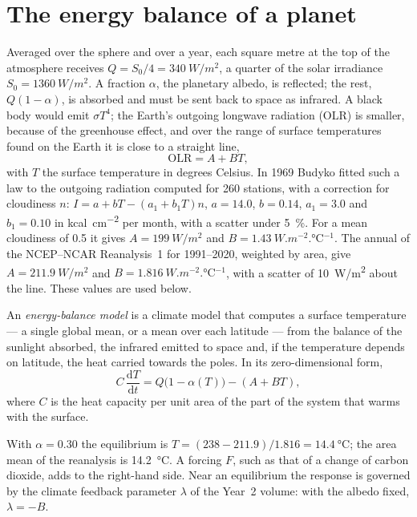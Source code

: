 \section{The energy balance of a planet}\label{sec:b3:climate-models:zero-d}

Averaged over the sphere and over a year, each square metre at the top of
the atmosphere receives $Q = S_0/4 = \qty{340}{W/m^2}$, a quarter of the
solar irradiance $S_0 = \qty{1360}{W/m^2}$. A fraction $\alpha$, the
planetary albedo, is reflected; the rest, $Q(1 - \alpha)$, is absorbed and
must be sent back to space as infrared. A black body would emit $\sigma
T^4$; the Earth's outgoing longwave radiation (OLR) is smaller, because of
the greenhouse effect, and over the range of surface temperatures found on
the Earth it is close to a straight line,
\[
\text{OLR} = A + BT ,
\]
with $T$ the surface temperature in degrees Celsius. In 1969 Budyko fitted
such a law to the outgoing radiation computed for 260 stations, with a correction for
cloudiness $n$: $I = a + bT - (a_1 + b_1T)n$, $a = 14.0$, $b = 0.14$, $a_1 =
3.0$ and $b_1 = 0.10$ in \unit{kcal.cm^{-2}} per month, with a scatter under
\qty{5}{\percent}. For a mean cloudiness of 0.5 it gives $A =
\qty{199}{W/m^2}$ and $B = \qty{1.43}{W.m^{-2}.\celsius^{-1}}$. The annual
 of the NCEP--NCAR Reanalysis~1 for 1991--2020, weighted by area,
give $A = \qty{211.9}{W/m^2}$ and $B = \qty{1.816}{W.m^{-2}.\celsius^{-1}}$,
with a scatter of \qty{10}{W/m^2} about the line. These values are used
below.

\begin{definition}\label{def:b3:climate-models:ebm}
An \emph{energy-balance model} is a climate
model that computes a surface temperature --- a single global mean, or a
mean over each latitude --- from the balance of the sunlight absorbed, the
infrared emitted to space and, if the temperature depends on latitude, the
heat carried towards the poles. In its zero-dimensional form,
\[
C\,\frac{\mathrm dT}{\mathrm dt} = Q\big(1 - \alpha(T)\big) - (A + BT) ,
\]
where $C$ is the heat capacity per unit area of the part of the system that
warms with the surface.
\end{definition}

With $\alpha = 0.30$ the equilibrium is $T = (238 - 211.9)/1.816 =
\qty{14.4}{\celsius}$; the area mean of the reanalysis is
\qty{14.2}{\celsius}. A forcing $F$, such as that of a change of carbon
dioxide, adds to the right-hand side. Near an equilibrium the response is
governed by the climate feedback parameter $\lambda$ of the Year~2 volume:
with the albedo fixed, $\lambda = -B$.

